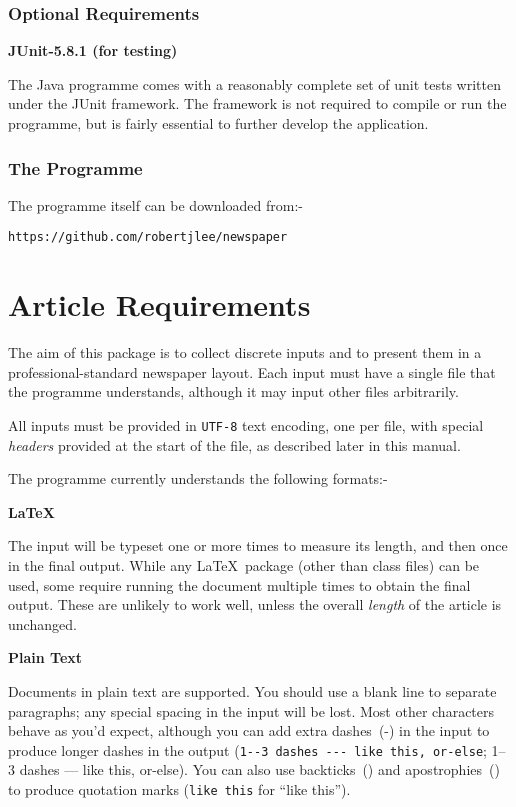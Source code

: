 \documentclass[a4paper,DIV=11]{scrartcl}
\newcommand{\deft}[2]{\nopagebreak\noindent\hspace{0.5in}\textbf{#1}\par\noindent{}#2\pagebreak[1]\par}
\begin{document}

\subsubsection*{Optional Requirements}

\deft{JUnit-5.8.1 (for testing)}{The Java programme comes with a
  reasonably complete set of unit tests written under the JUnit
  framework. The framework is not required to compile or run the
  programme, but is fairly essential to further develop the
  application.}

\subsubsection*{The Programme}

The programme itself can be downloaded from:-

\texttt{https://github.com/robertjlee/newspaper}

\section{Article Requirements}

The aim of this package is to collect discrete inputs and to present them
in a professional-standard newspaper layout. Each input must have a
single file that the programme understands, although it may input
other files arbitrarily.

All inputs must be provided in \texttt{UTF-8} text encoding, one per
file, with special \textit{headers} provided at the start of the file,
as described later in this manual.\pagebreak[1]

The programme currently understands the following formats:-

\deft{\LaTeX}{The input will be typeset one or more times to
measure its length, and then once in the final output. While any
\LaTeX\ package (other than class files) can be used, some
require running the document multiple times to obtain the final
output. These are unlikely to work well, unless the overall
\textit{length} of the article is unchanged.}

\deft{Plain Text}{Documents in plain text are supported. You should
use a blank line to separate paragraphs; any
special spacing in the input will be lost. Most other characters
behave as you'd expect, although you can add extra dashes~(-) in the input
to produce longer dashes in the output (\texttt{1-{}-3 dashes -{}-{}-
  like this, or-else}; 1--3 dashes --- like this, or-else). You can
also use backticks~(\textasciigrave) and apostrophies~(\textasciiacute) to produce quotation marks
(\texttt{\textasciigrave\textasciigrave like this\textasciiacute\textasciiacute} for ``like this''). }
\end{document}
